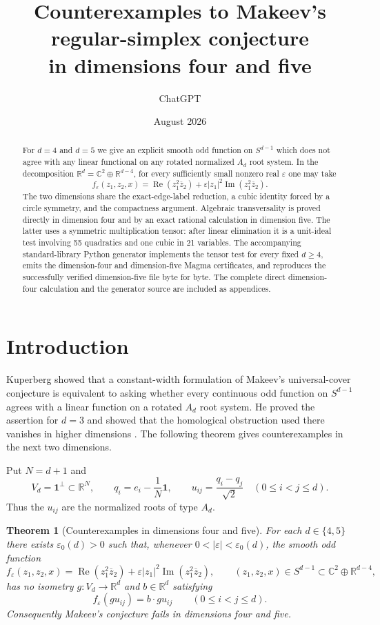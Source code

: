 \documentclass[11pt,reqno]{amsart}
\title[Counterexamples in dimensions four and five]
{Counterexamples to Makeev's regular-simplex conjecture\\
in dimensions four and five}
\author{ChatGPT}
\date{August 2026}
\newtheorem{theorem}{Theorem}[section]
\theoremstyle{remark}
\newcommand{\R}{\mathbb R}
\newcommand{\C}{\mathbb C}
\newcommand{\one}{\mathbf 1}
\newcommand{\eps}{\varepsilon}
\newcommand{\abs}[1]{\left\lvert #1\right\rvert}
\begin{document}
\begin{abstract}
For $d=4$ and $d=5$ we give an explicit smooth odd function on $S^{d-1}$
which does not agree with any linear functional on any rotated normalized
$A_d$ root system.  In the decomposition
$\R^d=\C^2\oplus\R^{d-4}$, for every sufficiently small nonzero real $\eps$
one may take
\[
 f_\eps(z_1,z_2,x)
 =\operatorname{Re}(z_1^2\overline z_2)
 +\eps\abs{z_1}^2\operatorname{Im}(z_1^2\overline z_2).
\]
The two dimensions share the exact-edge-label reduction, a cubic identity
forced by a circle symmetry, and the compactness argument.  Algebraic
transversality is proved directly in dimension four and by an exact rational
calculation in dimension five.  The latter uses a symmetric multiplication
tensor: after linear elimination it is a unit-ideal test involving 55
quadratics and one cubic in 21 variables.  The accompanying standard-library
Python generator implements the tensor test for every fixed $d\ge4$, emits
the dimension-four and dimension-five Magma certificates, and reproduces the
successfully verified dimension-five file byte for byte.  The complete
direct dimension-four calculation and the generator source are included as
appendices.
\end{abstract}

\maketitle

\section{Introduction}

Kuperberg showed that a constant-width formulation of Makeev's
universal-cover conjecture is equivalent to asking whether every continuous
odd function on $S^{d-1}$ agrees with a linear function on a rotated $A_d$
root system.  He proved the assertion for $d=3$ and showed that the homological
obstruction used there vanishes in higher dimensions \cite{Kuperberg1999}.
The following theorem gives counterexamples in the next two dimensions.

Put $N=d+1$ and
\[
 V_d=\one^\perp\subset\R^N,\qquad
 q_i=e_i-\frac1N\one,\qquad
 u_{ij}=\frac{q_i-q_j}{\sqrt2}
 \quad(0\le i<j\le d).
\]
Thus the $u_{ij}$ are the normalized roots of type $A_d$.

\begin{theorem}[Counterexamples in dimensions four and five]
\label{thm:counterexamples}
For each $d\in\{4,5\}$ there exists $\eps_0(d)>0$ such that, whenever
$0<\abs\eps<\eps_0(d)$, the smooth odd function
\begin{equation}\label{eq:counterexample-function}
 f_\eps(z_1,z_2,x)
 =\operatorname{Re}(z_1^2\overline z_2)
 +\eps\abs{z_1}^2\operatorname{Im}(z_1^2\overline z_2),
 \qquad (z_1,z_2,x)\in S^{d-1}\subset\C^2\oplus\R^{d-4},
\end{equation}
has no isometry $g:V_d\to\R^d$ and $b\in\R^d$ satisfying
\[
 f_\eps(gu_{ij})=b\cdot gu_{ij}
 \qquad(0\le i<j\le d).
\]
Consequently Makeev's conjecture fails in dimensions four and five.
\end{theorem}
\end{document}
